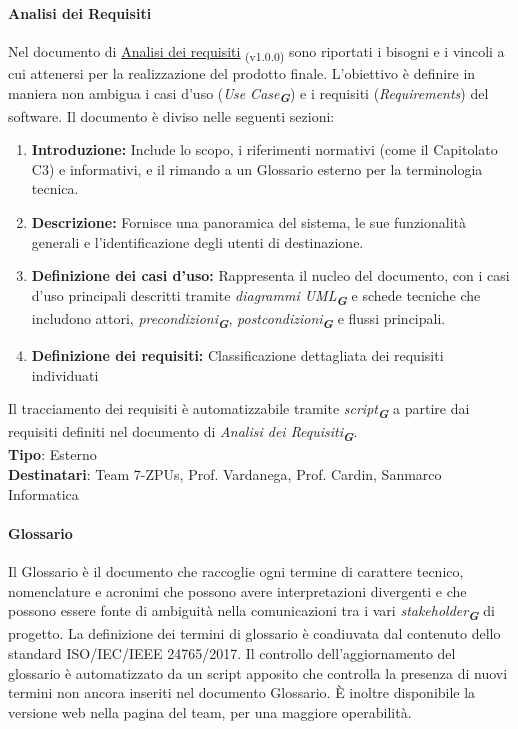 \documentclass[a4paper,12pt]{article}
\newcommand{\glossario}[1]{\textit{#1}\textsubscript{\textbf{\textit{\textcolor{lightblack}{G}}}}}
\newcommand{\ped}[1]{\textsubscript{#1}}
\begin{document}
\paragraph{Analisi dei Requisiti}\label{analisiDeiRequisiti}
Nel documento di
\href{https://7-zpus.github.io/Docs/assets/3_PB/DocumentiEsterni/AnalisiDeiRequisiti.pdf}{\ul{Analisi
        dei requisiti}} \ped{(v1.0.0)} sono
riportati i bisogni e i vincoli a cui attenersi per la realizzazione del
prodotto finale. L'obiettivo è definire in maniera non ambigua i casi d'uso
(\glossario{Use Case}) e i requisiti (\textit{Requirements}) del
software. Il documento è diviso nelle seguenti sezioni:
\begin{enumerate}
    \item \textbf{Introduzione:} Include lo scopo, i riferimenti normativi (come il Capitolato C3) e informativi, e il rimando a un Glossario esterno per la terminologia tecnica.
    \item \textbf{Descrizione:} Fornisce una panoramica del sistema, le sue funzionalità generali e l'identificazione degli utenti di destinazione.
    \item \textbf{Definizione dei casi d'uso:} Rappresenta il nucleo del documento, con i casi d'uso principali descritti tramite \glossario{diagrammi UML} e schede tecniche che includono attori, \glossario{precondizioni}, \glossario{postcondizioni} e flussi principali.
    \item \textbf{Definizione dei requisiti:} Classificazione dettagliata dei requisiti individuati
\end{enumerate}
Il tracciamento dei requisiti è automatizzabile tramite \glossario{script} a partire dai requisiti definiti nel documento di \glossario{Analisi dei Requisiti}. \\
\textbf{Tipo}: Esterno \\
\textbf{Destinatari}: Team 7-ZPUs, Prof. Vardanega, Prof. Cardin, Sanmarco Informatica \\

\paragraph{Glossario}
Il Glossario è il documento che raccoglie ogni termine di carattere tecnico,
nomenclature e acronimi che possono avere interpretazioni divergenti e che
possono essere fonte di ambiguità nella comunicazioni tra i vari \glossario{stakeholder}
di progetto. La definizione dei termini di glossario è coadiuvata dal contenuto
dello standard ISO/IEC/IEEE 24765/2017. Il controllo dell'aggiornamento del
glossario è automatizzato da un script apposito che controlla la presenza di
nuovi termini non ancora inseriti nel documento Glossario. È inoltre
disponibile la versione web nella pagina del team, per una maggiore
operabilità.
\end{document}
